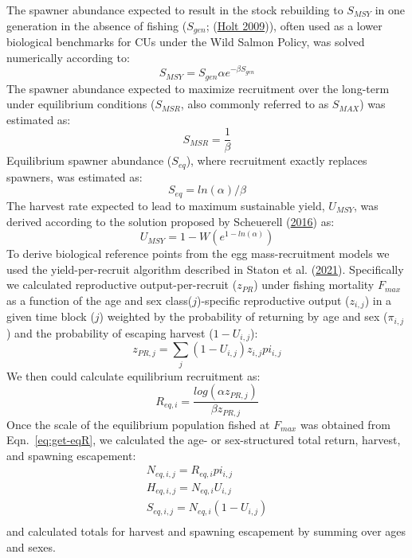 \documentclass[11pt]{book}
\begin{document}
The spawner abundance expected to result in the stock rebuilding to \(S_{MSY}\) in one generation in the absence of fishing (\(S_{gen}\); (\protect\hyperlink{ref-holtEvaluationBenchmarksConservation2009}{Holt 2009})), often used as a lower biological benchmarks for CUs under the Wild Salmon Policy, was solved numerically according to:
\begin{equation}
  S_{MSY} = S_{gen}\alpha e^{-\beta S_{gen}}
  \label{eq:get-Sgen}
\end{equation}
The spawner abundance expected to maximize recruitment over the long-term under equilibrium conditions (\(S_{MSR}\), also commonly referred to as \(S_{MAX}\)) was estimated as:
\begin{equation}
  S_{MSR} = \frac{1}{\beta}
  \label{eq:get-Smsr}
\end{equation}
Equilibrium spawner abundance (\(S_{eq}\)), where recruitment exactly replaces spawners, was estimated as:
\begin{equation}
  S_{eq} = ln(\alpha)/\beta
  \label{eq:get-Seq}
\end{equation}
The harvest rate expected to lead to maximum sustainable yield, \(U_{MSY}\), was derived according to the solution proposed by Scheuerell (\protect\hyperlink{ref-scheuerellExplicitSolutionCalculating2016}{2016}) as:
\begin{equation}
  U_{MSY} = 1 - W(e^{1-ln(\alpha)})
  \label{eq:get-Umsy}
\end{equation}
To derive biological reference points from the egg mass-recruitment models we used the yield-per-recruit algorithm described in Staton et al. (\protect\hyperlink{ref-staton_incorporating_2021}{2021}). Specifically we calculated reproductive output-per-recruit (\(z_{PR}\)) under fishing mortality \(F_{max}\) as a function of the age and sex class(\(j\))-specific reproductive output (\(z_{i,j}\)) in a given time block (\(j\)) weighted by the probability of returning by age and sex (\(\pi_{i,j}\)) and the probability of escaping harvest (\(1-U_{i,j}\)):
\begin{equation}
  z_{PR,j} = \sum_{j}(1-U_{i,j})z_{i,j}pi_{i,j}
  \label{eq:get-YPR}
\end{equation}
We then could calculate equilibrium recruitment as:
\begin{equation}
  R_{eq,i} = \frac{log(\alpha z_{PR,j})}{\beta z_{PR,j}}
  \label{eq:get-eqR}
\end{equation}
Once the scale of the equilibrium population fished at \(F_{max}\) was obtained from Eqn.~\ref{eq:get-eqR}, we calculated the age- or sex-structured total return, harvest, and spawning escapement:
\begin{equation}
  \begin{aligned}
  N_{eq,i,j}=R_{eq,i}pi_{i,j} \\
  H_{eq,i,j}=N_{eq,i}U_{i,j} \\
  S_{eq,i,j}=N_{eq,i}(1-U_{i,j}) \\
  \end{aligned}
  \label{eq:get-eqNHS}
\end{equation}
and calculated totals for harvest and spawning escapement by summing over ages and sexes.
\end{document}
